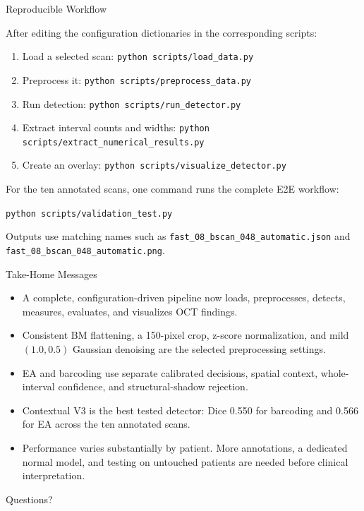 \documentclass[aspectratio=169]{beamer}
\begin{document}
\begin{frame}{Reproducible Workflow}

After editing the configuration dictionaries in the corresponding scripts:

\begin{enumerate}
    \item Load a selected scan: \texttt{python scripts/load\_data.py}
    \item Preprocess it: \texttt{python scripts/preprocess\_data.py}
    \item Run detection: \texttt{python scripts/run\_detector.py}
    \item Extract interval counts and widths:
    \texttt{python scripts/extract\_numerical\_results.py}
    \item Create an overlay: \texttt{python scripts/visualize\_detector.py}
\end{enumerate}

\vspace{0.3cm}

For the ten annotated scans, one command runs the complete E2E workflow:

\begin{center}
\texttt{python scripts/validation\_test.py}
\end{center}

Outputs use matching names such as
\texttt{fast\_08\_bscan\_048\_automatic.json} and
\texttt{fast\_08\_bscan\_048\_automatic.png}.

\end{frame}

\begin{frame}{Take-Home Messages}

\begin{itemize}
    \item A complete, configuration-driven pipeline now loads, preprocesses,
    detects, measures, evaluates, and visualizes OCT findings.
    \item Consistent BM flattening, a 150-pixel crop, z-score normalization,
    and mild $(1.0,0.5)$ Gaussian denoising are the selected preprocessing
    settings.
    \item EA and barcoding use separate calibrated decisions, spatial context,
    whole-interval confidence, and structural-shadow rejection.
    \item Contextual V3 is the best tested detector: Dice 0.550 for barcoding
    and 0.566 for EA across the ten annotated scans.
    \item Performance varies substantially by patient. More annotations, a
    dedicated normal model, and testing on untouched patients are needed
    before clinical interpretation.
\end{itemize}

\vfill
\centering
\Large Questions?

\end{frame}
\end{document}
